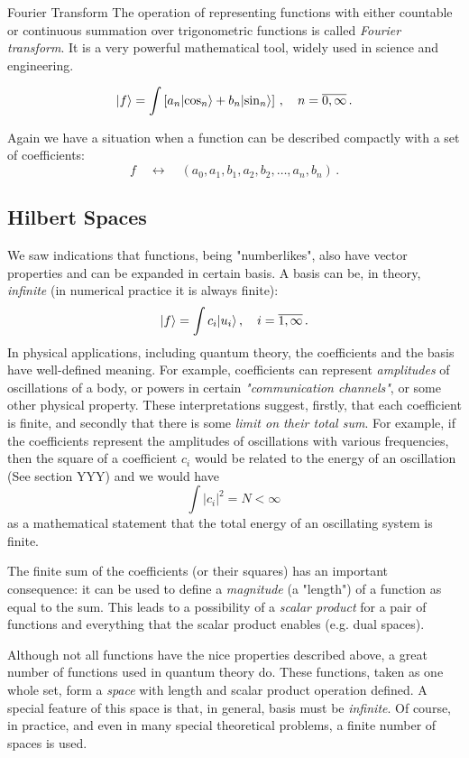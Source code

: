  \begin{mybio}{Fourier Transform}
 	The operation of representing functions with either countable or continuous summation over trigonometric functions is called \emph{Fourier transform}. It is a very powerful mathematical tool, widely used in science and engineering.
 	
 	\[
 	|{f}\rangle =  \int \left\lbrack a_n|{\cos_n}\rangle+b_n|{\sin_n}\rangle\right\rbrack \,,\quad n=\overline{0,\infty}\,.
 	\]
 \end{mybio}

Again we have a situation when a function can be described compactly with a set of coefficients:
\[
f\quad\leftrightarrow\quad (a_0, a_1, b_1, a_2, b_2, \ldots, a_n, b_n)\,.
\]

\subsection{Hilbert Spaces}
We saw indications that functions, being "numberlikes", also have vector properties and can be expanded in certain basis. A basis can be, in theory, \emph{infinite} (in numerical practice it is always finite):
\[
|{f}\rangle = \int c_i|{u_i}\rangle\,,\quad i=\overline{1, \infty}\,.
\]
In physical applications, including quantum theory, the coefficients and the basis have  well-defined meaning. For example, coefficients can represent \emph{amplitudes} of oscillations of a body, or powers in certain \emph{"communication channels"}, or some other physical property. These interpretations suggest, firstly, that each coefficient is finite, and secondly that there is some \emph{limit on their total sum}. For example, if the coefficients represent the amplitudes of oscillations with various frequencies, then the square of a coefficient $c_i$ would be related to the energy of an oscillation (See section YYY) and we would have
\[
\int |c_i|^2  = N < \infty\,
\]
as a mathematical statement that the total energy of an oscillating system is finite.

The finite sum of the coefficients (or their squares) has an important consequence: it can be used to define a \emph{magnitude} (a "length") of a function as equal to the sum. This leads to a possibility of a \emph{scalar product} for a pair of functions and everything that the scalar product enables (e.g. dual spaces).

Although not all functions have the nice properties described above, a great number of functions used in quantum theory do. These functions, taken as one whole set, form a \emph{space} with length and scalar product operation defined. A special feature of this space is that, in general, basis must be \emph{infinite}. Of course, in practice, and even in many special theoretical problems, a finite number of spaces is used.

